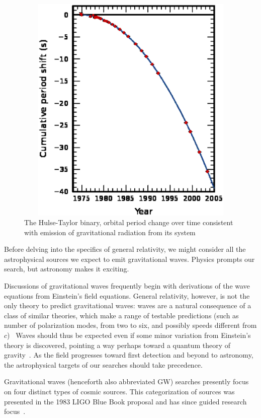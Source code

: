 	\begin{figure}
	\begin{center}
	\includegraphics[height=111mm, width=148mm]{500px-PSR_B1913+16_period_shift_graph.eps}
	\caption{The Hulse-Taylor binary, orbital period change over time consistent with emission of gravitational radiation from its system}
	\label{Hulse-Taylor_binary}
	\end{center}
	\end{figure}

		Before delving into the specifics of general relativity, we might consider all the astrophysical sources we expect to emit gravitational waves. Physics prompts our search, but astronomy makes it exciting.

	Discussions of gravitational waves frequently begin with derivations of the wave equations from Einstein's field equations. 
General relativity, however, is not the only theory to predict gravitational waves: waves are a natural consequence of a class of similar theories, which make a range of testable predictions (such as number of polarization modes, from two to six, and possibly speeds different from $c$)~\cite{Will1993} 
Waves should thus be expected even if some minor variation from Einstein's theory is discovered, pointing a way perhaps toward a quantum theory of gravity~\cite{Sathyaprakash2009}. 
As the field progresses toward first detection and beyond to astronomy, the astrophysical targets of our searches should take precedence.

		Gravitational waves (henceforth also abbreviated GW) searches presently focus on four distinct types of cosmic sources.
This categorization of sources was presented in the 1983 LIGO Blue Book proposal and has since guided research focus~\cite{CollinsGravityShadow}. 

